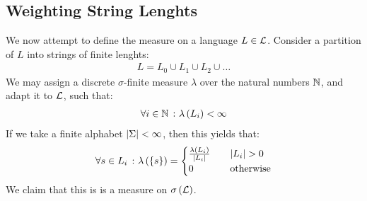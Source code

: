 \subsection{Weighting String Lenghts}
We now attempt to define the measure on a language \(L \in \mathcal{L}\).
Consider a partition of \(L\) into strings of finite lenghts:
\begin{align*}
  L = L_0 \cup L_1 \cup L_2 \cup \ldots
\end{align*}
We may assign a discrete \(\sigma\)-finite
measure \(\lambda\) over the natural numbers \(\mathbb{N}\),
and adapt it to \(\mathcal{L}\), such that:
\begin{align*}
  \forall i \in \mathbb{N} \ \colon \lambda\left(L_i\right) < \infty
\end{align*}
If we take a finite alphabet \(\left\lvert\Sigma\right\rvert < \infty\), then this yields that:
\begin{align*}
  \forall s \in L_i \ \colon
    \lambda \left(\left\{s\right\}\right)
      =
      \begin{cases}
        \frac{\lambda\left(L_i\right)}{\left\lvert L_i\right\rvert}
          & \quad \left\lvert L_i\right\rvert > 0 \\
        0 & \quad \text{otherwise}
      \end{cases}
\end{align*}
We claim that this is is a measure on \(\sigma\left(\mathcal{L}\right)\).



